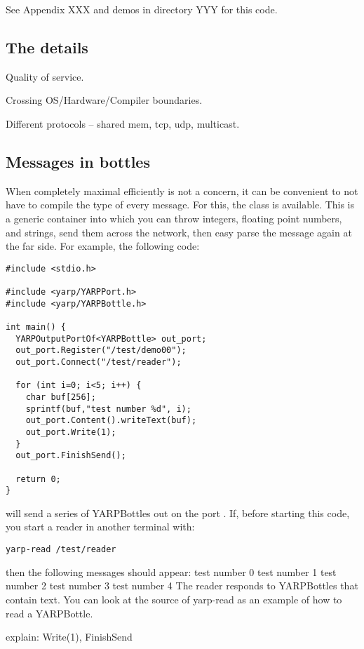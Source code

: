 See Appendix XXX and demos in directory YYY for this code.


\subsection{The details}

Quality of service. 

Crossing OS/Hardware/Compiler boundaries.

Different protocols -- shared mem, tcp, udp, multicast.



\subsection{Messages in bottles}

When completely maximal efficiently is not a concern, it can be 
convenient to not have to compile the type of every message.
For this, the  class is available.  This is a generic
container into which you can throw integers, floating point numbers,
and strings, send them across the network, then easy parse the message
again at the far side.  For example, the following code:
%
\begin{verbatim}
#include <stdio.h>

#include <yarp/YARPPort.h>
#include <yarp/YARPBottle.h>

int main() {
  YARPOutputPortOf<YARPBottle> out_port;
  out_port.Register("/test/demo00");
  out_port.Connect("/test/reader");

  for (int i=0; i<5; i++) {
    char buf[256];
    sprintf(buf,"test number %d", i);
    out_port.Content().writeText(buf);
    out_port.Write(1);
  }
  out_port.FinishSend();

  return 0;
}
\end{verbatim}
%
will send a series of YARPBottles out on the port .
If, before starting this code, you start a reader in another terminal with:
%
\begin{verbatim}
yarp-read /test/reader
\end{verbatim}
%
then the following messages should appear:
%
test number 0
test number 1
test number 2
test number 3
test number 4
%
The  reader responds to YARPBottles that contain text.
You can look at the source of yarp-read as an example of how to read 
a YARPBottle.

explain: Write(1), FinishSend
